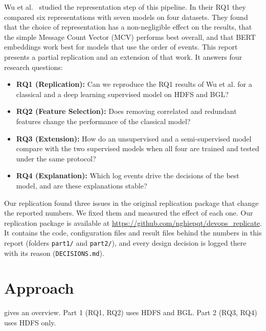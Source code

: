 \documentclass[10pt, conference]{IEEEtran}
\newcommand{\repourl}{\url{https://github.com/nghiepqt/devops_replicate}}
\begin{document}
Wu et al.~\cite{wu2023effectiveness} studied the representation step of this pipeline. In their RQ1 they compared six representations with seven models on four datasets. They found that the choice of representation has a non-negligible effect on the results, that the simple Message Count Vector (MCV) performs best overall, 
and that BERT embeddings work best for models that use the order of events. This report presents a partial replication and an extension of that work. It answers four research questions:

\begin{itemize}
\item \textbf{RQ1 (Replication):} Can we reproduce the RQ1 results of Wu et al. for a classical and a deep learning supervised model on HDFS and BGL?
\item \textbf{RQ2 (Feature Selection):} Does removing correlated and redundant features change the performance of the classical model?
\item \textbf{RQ3 (Extension):} How do an unsupervised and a semi-supervised model compare with the two supervised models when all four are trained and tested under the same protocol?
\item \textbf{RQ4 (Explanation):} Which log events drive the decisions of the best model, and are these explanations stable?
\end{itemize}

Our replication found three issues in the original replication package that change the reported numbers. We fixed them and measured the effect of each one. Our replication package is available at \repourl{}. It contains the code, configuration files and result files behind the numbers in this report (folders \texttt{part1/} and \texttt{part2/}), and every design decision is logged there with its reason (\texttt{DECISIONS.md}).

\section{Approach}
\label{sec:approach}

 gives an overview. Part 1 (RQ1, RQ2) uses HDFS and BGL. Part 2 (RQ3, RQ4) uses HDFS only.
\end{document}
